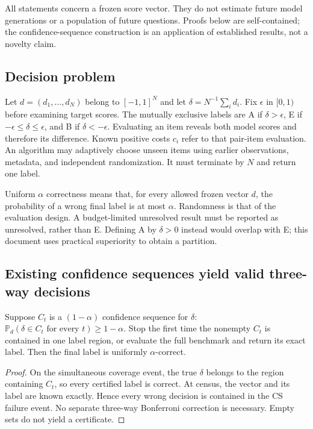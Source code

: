 All statements concern a frozen score vector. They do not estimate future model generations or a population of future questions. Proofs below are self-contained; the confidence-sequence construction is an application of established results, not a novelty claim.

\subsection{Decision problem}\label{theory:1}

Let \(d=(d_1,\ldots,d_N)\) belong to \([-1,1]^N\) and let \(\delta=N^{-1}\sum_i d_i\). Fix \(\epsilon\) in \([0,1)\) before examining target scores. The mutually exclusive labels are A if \(\delta>\epsilon\), E if \(-\epsilon\le\delta\le\epsilon\), and B if \(\delta<-\epsilon\). Evaluating an item reveals both model scores and therefore its difference. Known positive costs \(c_i\) refer to that pair-item evaluation. An algorithm may adaptively choose unseen items using earlier observations, metadata, and independent randomization. It must terminate by \(N\) and return one label.

Uniform \(\alpha\) correctness means that, for every allowed frozen vector \(d\), the probability of a wrong final label is at most \(\alpha\). Randomness is that of the evaluation design. A budget-limited unresolved result must be reported as unresolved, rather than E. Defining A by \(\delta>0\) instead would overlap with E; this document uses practical superiority to obtain a partition.

\subsection{Existing confidence sequences yield valid three-way decisions}\label{theory:2}

\begin{proposition}\label{app-proposition1} Suppose \(C_t\) is a \((1-\alpha)\) confidence sequence for \(\delta\): \(\mathbb P_d(\delta\in C_t\text{ for every }t)\ge1-\alpha\). Stop the first time the nonempty \(C_t\) is contained in one label region, or evaluate the full benchmark and return its exact label. Then the final label is uniformly \(\alpha\)-correct.
\end{proposition}

\begin{proof} On the simultaneous coverage event, the true \(\delta\) belongs to the region containing \(C_t\), so every certified label is correct. At census, the vector and its label are known exactly. Hence every wrong decision is contained in the CS failure event. No separate three-way Bonferroni correction is necessary. Empty sets do not yield a certificate. \end{proof}

